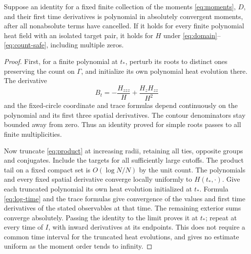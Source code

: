 \begin{lemma}
\label{lem:slice-passage}
Suppose an identity for a fixed finite collection of the moments
\eqref{eq:moments}, $D$, and their first time derivatives is polynomial
in absolutely convergent moments, after all nonabsolute terms have
cancelled. If it holds for every finite polynomial heat field with an
isolated target pair, it holds for $H$ under \eqref{eq:domain}--
\eqref{eq:count-safe}, including multiple zeros.
\end{lemma}

\begin{proof}
First, for a finite polynomial at $t_*$, perturb its roots to distinct
ones preserving the count on $\Gamma$, and initialize its own polynomial
heat evolution there. The derivative
\begin{equation}
 B_t=-\frac{H_{zzz}}H+\frac{H_zH_{zz}}{H^2}
 \label{eq:log-time}
\end{equation}
and the fixed-circle coordinate and trace formulas depend continuously
on the polynomial and its first three spatial derivatives. The contour
denominators stay bounded away from zero. Thus an identity proved for
simple roots passes to all finite multiplicities.

Now truncate \eqref{eq:product} at increasing radii, retaining all ties,
opposite groups and conjugates. Include the targets for all sufficiently
large cutoffs. The product tail on a fixed compact set is
$O(\log N/N)$ by the unit count. The polynomials and every fixed
spatial derivative converge locally uniformly to $H(t_*,\cdot)$.
Give each truncated polynomial its own heat evolution initialized at
$t_*$. Formula \eqref{eq:log-time} and the trace formulas give convergence
of the values and first time derivatives of the stated observables at
that time. The remaining exterior sums converge absolutely. Passing
the identity to the limit proves it at $t_*$; repeat at every time
of $I$, with inward derivatives at its endpoints. This does not require
a common time interval for the truncated heat evolutions, and gives
no estimate uniform as the moment order tends to infinity.
\end{proof}

